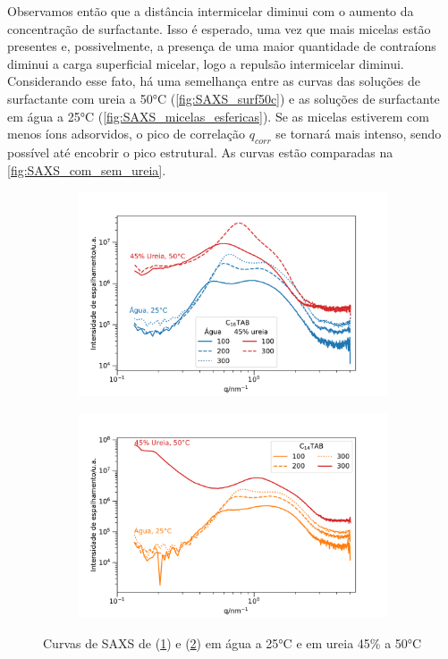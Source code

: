 	Observamos então que a distância intermicelar diminui com o aumento da concentração de surfactante. Isso é esperado, uma vez que mais micelas estão presentes e, possivelmente, a presença de uma maior quantidade de contraíons diminui a carga superficial micelar, logo a repulsão intermicelar diminui. Considerando esse fato, há uma semelhança entre as curvas das soluções de surfactante com ureia a 50°C (\autoref{fig:SAXS_surf50c}) e as soluções de surfactante em água a 25°C (\autoref{fig:SAXS_micelas_esfericas}). Se as micelas estiverem com menos íons adsorvidos, o pico de correlação \(q_{corr}\) se tornará mais intenso, sendo possível até encobrir o pico estrutural. As curvas estão comparadas na \autoref{fig:SAXS_com_sem_ureia}.

	
	\begin{figure}[h]
		\begin{subfigure}[t]{0.5\textwidth}
			\centering
			\includegraphics[width=\textwidth]{./imagens/saxs/micelas_CTAB_agua_ureia}
			\caption{\CTAB}
			\label{fig:SAXS_CTAB_com_sem_ureia}
		\end{subfigure} %
		\begin{subfigure}[t]{0.5\textwidth}
			\centering
			\includegraphics[width=\textwidth]{./imagens/saxs/micelas_TTAB_agua_ureia}
			\caption{\TTAB}
			\label{fig:SAXS_TTAB_com_sem_ureia}
		\end{subfigure}
		\caption{Curvas de SAXS de \CTAB{} (\ref{fig:SAXS_CTAB_com_sem_ureia}) e \TTAB{} (\ref{fig:SAXS_TTAB_com_sem_ureia}) em água a 25°C e em ureia 45\% a 50°C}
		\label{fig:SAXS_com_sem_ureia}
	\end{figure}
	
